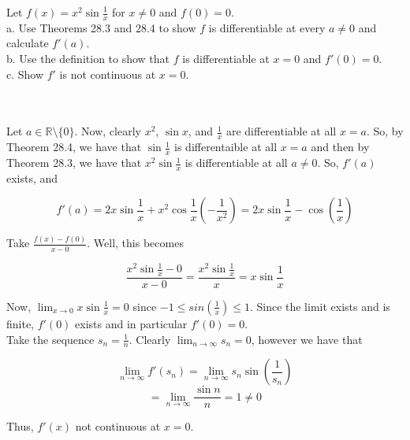 Let $f(x)=x^2\sin{\frac{1}{x}}$ for $x\neq0$ and $f(0)=0$.\\

a. Use Theorems 28.3 and 28.4 to show $f$ is differentiable at every $a\neq0$ and calculate $f'(a)$.\\

b. Use the definition to show that $f$ is differentiable at $x=0$ and $f'(0)=0$.\\

c. Show $f'$ is not continuous at $x=0$.\\\\

\begin{solution}\renewcommand{\qedsymbol}{}\ \\
    Let $a\in\mathbb{R}\setminus\{0\}$. Now, clearly $x^2$, $\sin x$, and $\frac1x$ are differentiable
    at all $x=a$. So, by Theorem 28.4, we have that $\sin{\frac1x}$ is differentaible at all $x=a$ and
    then by Theorem 28.3, we have that $x^2\sin{\frac1x}$ is differentiable at all $a\neq0$. So, $f'(a)$
    exists, and
    
    $$f'(a)=2x\sin{\frac1x}+x^2\cos{\frac1x}(-\frac{1}{x^2})=2x\sin{\frac1x}-\cos({\frac1x})$$

    Take $\frac{f(x)-f(0)}{x-0}$. Well, this becomes
    
    $$\frac{x^2\sin{\frac{1}{x}}-0}{x-0}=\frac{x^2\sin{\frac{1}{x}}}{x}=x\sin{\frac{1}{x}}$$
    
    Now, $\lim_{x\rightarrow0}x\sin{\frac{1}{x}}=0$ since $-1\leq sin(\frac1x)\leq1$. Since the limit
    exists and is finite, $f'(0)$ exists and in particular $f'(0)=0$.\\

    Take the sequence $s_n=\frac{1}{n}$. Clearly $\lim_{n\rightarrow\infty}s_n=0$, however we have that
    
    $$\lim_{n\rightarrow\infty}f'(s_n)=\lim_{n\rightarrow\infty}s_n\sin(\frac{1}{s_n})$$
    $$=\lim_{n\rightarrow\infty}\frac{\sin n}{n}=1\neq0$$
    
    Thus, $f'(x)$ not continuous at $x=0$.

\end{solution}